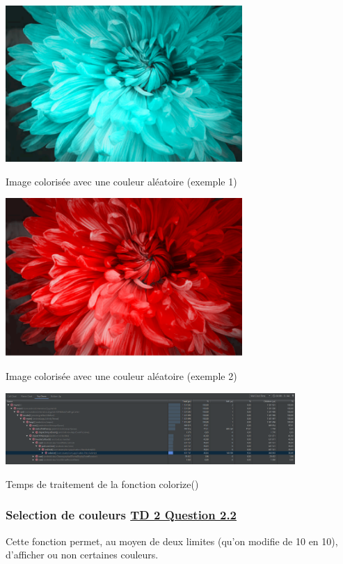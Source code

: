 \documentclass{article}
\begin{document}
\begin{center} 
    \includegraphics[width=9cm]{../Image_fonctions/RandomCouleur1}

    Image colorisée avec une couleur aléatoire (exemple 1)
\end{center}
\bigbreak

\begin{center} 
    \includegraphics[width=9cm]{../Image_fonctions/RandomCouleur2}

    Image colorisée avec une couleur aléatoire (exemple 2)
\end{center}
\bigbreak

\begin{center} 
    \includegraphics[width=11cm]{../Image_temps/TempsColorize}

    Temps de traitement de la fonction colorize()
\end{center}
\bigbreak

\subsubsection{Selection de couleurs \underline{TD 2 Question 2.2}}
Cette fonction permet, au moyen de deux limites (qu'on modifie de 10 en 10), d'afficher ou non certaines couleurs.
\bigbreak
\end{document}
